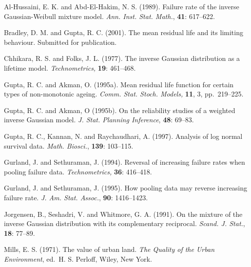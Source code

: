 \documentclass{ws-ijicc}
\begin{document}
\begin{thebibliography}
Al-Hussaini, E. K. and Abd-El-Hakim, N. S. (1989). Failure rate of the
inverse Gaussian-Weibull mixture model. {\it Ann. Inst. Stat. Math.},
{\bf 41}: 617--622.

Bradley, D. M. and Gupta, R. C. (2001). The mean residual life and
its limiting behaviour. Submitted for publication.

Chhikara, R. S. and Folks, J. L. (1977). The inverse Gaussian
distribution as a lifetime model. {\it Technometrics,} {\bf 19}:
461--468.

Gupta, R. C. and Akman, O. (1995a). Mean residual life function
for certain types of non-monotonic ageing.
{\it Comm. Stat. Stoch. Models,} {\bf 11}, 3, pp.~219--225.

Gupta, R. C. and Akman, O (1995b). On the reliability studies of a
weighted inverse Gaussian model. {\it J. Stat. Planning Inference},
{\bf 48}: 69--83.

Gupta, R. C., Kannan, N. and Raychaudhari, A. (1997). Analysis of
log normal survival data. {\it Math. Biosci.}, {\bf 139}: 103--115.

Gurland, J. and Sethuraman, J. (1994). Reversal of increasing
failure rates when pooling failure data. {\it Technometrics,}
{\bf 36}: 416--418.

Gurland, J. and Sethuraman, J. (1995). How pooling data may
reverse increasing failure rate. {\it J. Am. Stat. Assoc.},
{\bf 90}: 1416--1423.

Jorgensen, B., Seshadri, V. and Whitmore, G. A. (1991). On the
mixture of the inverse Gaussian distribution with its complementary
reciprocal. {\it Scand. J. Stat.}, {\bf 18}: 77--89.

Mills, E. S. (1971). The value of urban land. {\it The
Quality of the Urban Environment}, ed.~H. S. Perloff, Wiley, New York.


\end{thebibliography}
\end{document}
